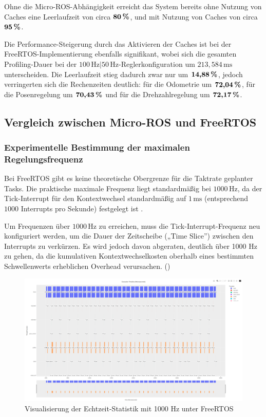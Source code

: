 Ohne die Micro-ROS-Abhängigkeit erreicht das System bereits ohne Nutzung von
Caches eine Leerlaufzeit von circa $\textbf{80\,\%}$, und mit Nutzung von Caches
von circa $\textbf{95\,\%}$.

Die Performance-Steigerung durch das Aktivieren der Caches ist bei der
FreeRTOS-Implementierung ebenfalls signifikant, wobei sich die gesamten
Profiling-Dauer bei der $100\,\text{Hz}|50\,\text{Hz}$-Reglerkonfiguration um
$213,584\,\text{ms}$ unterscheiden. Die Leerlaufzeit stieg dadurch zwar nur um
$\textbf{14,88\,\%}$, jedoch verringerten sich die Rechenzeiten deutlich: für
die Odometrie um $\textbf{72,04\,\%}$, für die Posenregelung um
$\textbf{70,43\,\%}$ und für die Drehzahlregelung um $\textbf{72,17\,\%}$.

\subsection{Vergleich zwischen Micro-ROS und FreeRTOS}

\subsubsection{Experimentelle Bestimmung der maximalen Regelungsfrequenz}

Bei FreeRTOS gibt es keine theoretische Obergrenze für die Taktrate geplanter
Tasks. Die praktische maximale Frequenz liegt standardmäßig bei
$1000\,\text{Hz}$, da der Tick-Interrupt für den Kontextwechsel standardmäßig
auf $1\,\text{ms}$ (entsprechend $1000$ Interrupts pro Sekunde) festgelegt ist
\cite{FreertosTasks}.

Um Frequenzen über $1000\,\text{Hz}$ zu erreichen, muss die
Tick-Interrupt-Frequenz neu konfiguriert werden, um die Dauer der Zeitscheibe
(„Time Slice”) zwischen den Interrupts zu verkürzen. Es wird jedoch davon
abgeraten, deutlich über 1000 Hz zu gehen, da die kumulativen
Kontextwechselkosten oberhalb eines bestimmten Schwellenwerts erheblichen
Overhead verursachen. (\cite{FreertosForumHF2019, FreertosTickRate2010})

\begin{figure}[H]
    \centering
    \includegraphics[width=1\textwidth]{assets/freertos_profiling_1000hz}
    \caption{Visualisierung der Echtzeit-Statistik mit 1000 Hz unter FreeRTOS}
\end{figure}

